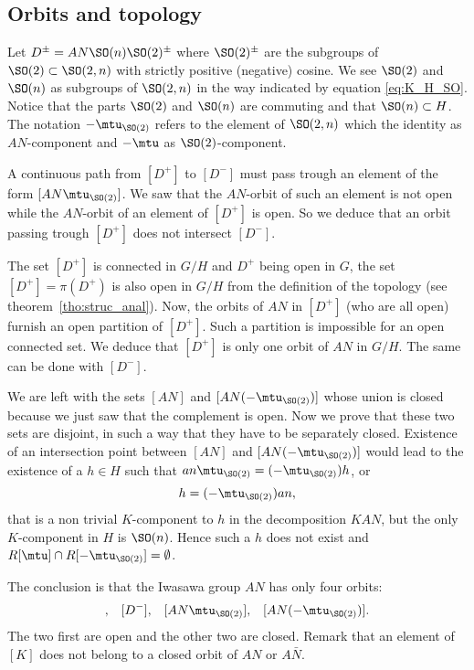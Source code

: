 \subsection{Orbits  and topology}
\label{PgTopoOrb}

Let  $D^{\pm}=AN\SO(n)\SO(2)^{\pm}$ where $\SO(2)^{\pm}$ are the subgroups of $\SO(2)\subset \SO(2,n)$ with strictly positive (negative) cosine. We see $\SO(2)$ and $\SO(n)$ as subgroups of $\SO(2,n)$ in the way indicated by equation \eqref{eq:K_H_SO}. Notice that the parts $\SO(2)$ and $\SO(n)$ are commuting and that $\SO(n)\subset H$. The notation $-\mtu_{\SO(2)}$ refers to the element of $\SO(2,n)$ which the identity as $AN$-component and $-\mtu$ as $\SO(2)$-component.

A continuous path from $[D^+]$ to $[D^-]$ must pass trough an element of the form $[AN\mtu_{\SO(2)}]$. We saw that the $AN$-orbit of such an element is not open while the $AN$-orbit of an element of $[D^+]$ is open. So we deduce that an orbit passing trough $[D^+]$ does not intersect $[D^-]$.

The set $[D^+]$ is connected in $G/H$ and $D^+$  being open in $G$, the set $[D^+]=\pi(D^+)$ is also open in $G/H$ from the definition of the topology (see theorem~\ref{tho:struc_anal}). Now, the orbits of $AN$ in $[D^+]$ (who are all open) furnish an open partition of $[D^+]$. Such a partition is impossible for an open connected set. We deduce that $[D^+]$ is only one orbit of $AN$ in $G/H$. The same can be done with $[D^-]$.

We are left with the sets $[AN]$ and $[AN(-\mtu_{\SO(2)})]$ whose union is closed because we just saw that the complement is open. Now we prove that these two sets are disjoint, in such a way that they have to be separately closed. Existence of an intersection point between $[AN]$ and $[AN(-\mtu_{\SO(2)})]$ would lead to the existence of a $h\in H$ such that $an\mtu_{\SO(2)}=(-\mtu_{\SO(2)})h$, or
\[
	h=(-\mtu_{\SO(2)})an,
\]
that is a non trivial $K$-component to $h$ in the decomposition $KAN$, but the only $K$-component in $H$ is $\SO(n)$. Hence such a $h$ does not exist and $R[\mtu]\cap R[-\mtu_{\SO(2)}]=\emptyset$.

The conclusion is that the Iwasawa group $AN$ has only four orbits:
\begin{align}
	[D^+], &  & [D^-], &  & [AN\mtu_{\SO(2)}], &  & [AN(-\mtu_{\SO(2)})].
\end{align}
The two first are open and the other two are closed. Remark\label{PgNoticeKpassung} that an element of $[K]$ does not belong to a closed orbit of $AN$ or $A\bar N$.


